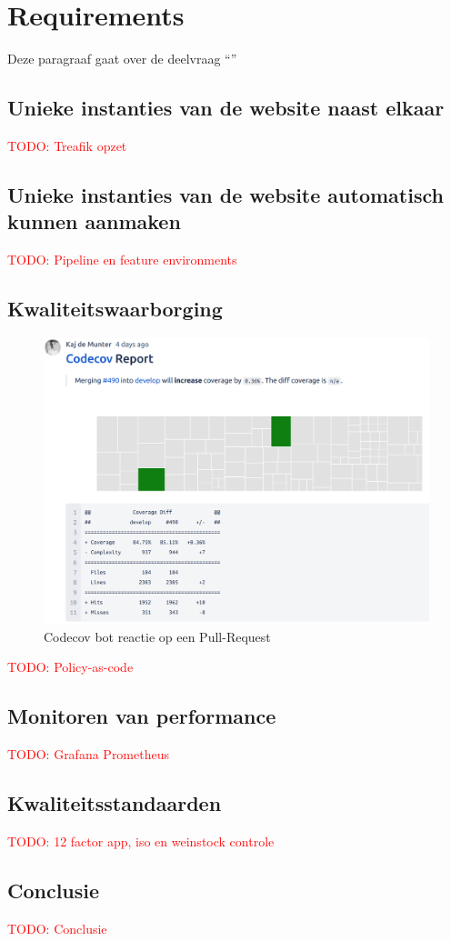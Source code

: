 \chapter{Requirements}

\label{Chapter7}

Deze paragraaf gaat over de deelvraag \enquote{\deelrequirements}


\section{Unieke instanties van de website naast elkaar}
\textcolor{red}{TODO: Treafik opzet}

\section{Unieke instanties van de website automatisch kunnen aanmaken}
\textcolor{red}{TODO: Pipeline en feature environments}

\section{Kwaliteitswaarborging}

\begin{figure}[H]
	\centering
	\includegraphics[width=13cm]{Figures/coverage}
	\decoRule
	\caption[Codecov bot]{Codecov bot reactie op een Pull-Request}
	\label{fig:coverage}
\end{figure}

\textcolor{red}{TODO: Policy-as-code} %

\section{Monitoren van performance}

\textcolor{red}{TODO: Grafana Prometheus} %

\section{Kwaliteitsstandaarden}

\textcolor{red}{TODO: 12 factor app, iso en weinstock controle} %

\section{Conclusie}

\textcolor{red}{TODO: Conclusie} %
